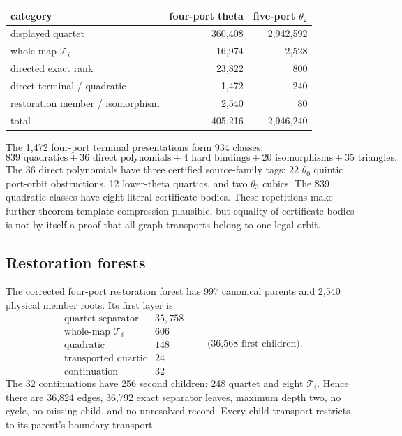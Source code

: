 \documentclass[11pt]{article}
\theoremstyle{remark}
\newcommand{\Ti}{\mathcal T_i}
\begin{document}
\begin{center}
\begin{tabular}{lrr}
\toprule
category & four-port theta & five-port \(\theta_2\)\\
\midrule
displayed quartet & 360,408 & 2,942,592\\
whole-map \(\Ti\) & 16,974 & 2,528\\
directed exact rank & 23,822 & 800\\
direct terminal / quadratic & 1,472 & 240\\
restoration member / isomorphism & 2,540 & 80\\
\midrule
total & 405,216 & 2,946,240\\
\bottomrule
\end{tabular}
\end{center}

The 1,472 four-port terminal presentations form 934 classes:
\[
839\text{ quadratics}+36\text{ direct polynomials}+4\text{ hard bindings}
+20\text{ isomorphisms}+35\text{ triangles}.
\]
The 36 direct polynomials have three certified source-family tags:
22 \(\theta_0\) quintic port-orbit obstructions, 12 lower-theta quartics,
and two \(\theta_3\) cubics.  The 839 quadratic classes have eight literal
certificate bodies.  These repetitions make further theorem-template
compression plausible, but equality of certificate bodies is not by itself a
proof that all graph transports belong to one legal orbit.



\subsection{Restoration forests}

The corrected four-port restoration forest has 997 canonical parents and
2,540 physical member roots.  Its first layer is
\[
\begin{array}{lr}
\text{quartet separator}&35,758\\
\text{whole-map \(\Ti\)}&606\\
\text{quadratic}&148\\
\text{transported quartic}&24\\
\text{continuation}&32
\end{array}
\qquad\text{(36,568 first children).}
\]
The 32 continuations have 256 second children: 248 quartet and eight
\(\Ti\).  Hence there are 36,824 edges, 36,792 exact separator leaves,
maximum depth two, no cycle, no missing child, and no unresolved record.
Every child transport restricts to its parent's boundary transport.
\end{document}
